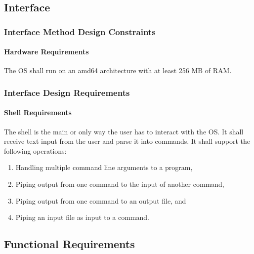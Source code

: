 \subsection{Interface}

\subsubsection{Interface Method Design Constraints}
\paragraph{Hardware Requirements} The OS shall run on an amd64 architecture with at least 256 MB of RAM.

\subsubsection{Interface Design Requirements}
	\paragraph{Shell Requirements}
	The shell is the main or only way the user has to interact with the OS. It shall receive text input from the user and parse it into commands. It shall support the following operations:
  \begin{enumerate}
    \item Handling multiple command line arguments to a program,
    \item Piping output from one command to the input of another command,
    \item Piping output from one command to an output file, and
		\item Piping an input file as input to a command.
  \end{enumerate}
	





\subsection{Functional Requirements}

